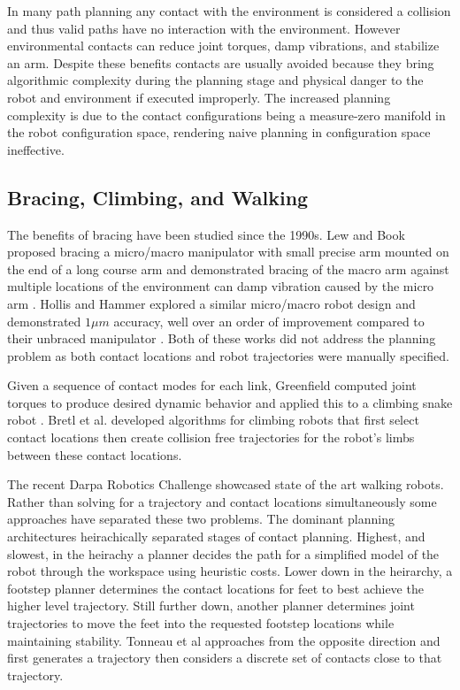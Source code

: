\documentclass[../thesis.tex]{subfiles}
\begin{document}
In many path planning any contact with the environment is considered a collision and thus valid paths have no interaction with the environment.
However environmental contacts can reduce joint torques, damp vibrations, and stabilize an arm.
Despite these benefits contacts are usually avoided because they bring algorithmic complexity during the planning stage and physical danger to the robot and environment if executed improperly.
The increased planning complexity is due to the contact configurations being a measure-zero manifold in the robot configuration space, rendering naive planning in configuration space ineffective. 


\subsection{Bracing, Climbing, and Walking}
The benefits of bracing have been studied since the 1990s.
Lew and Book proposed bracing a micro/macro manipulator with small precise arm mounted on the end of a long course arm and demonstrated bracing of the macro arm against multiple locations of the environment can damp vibration caused by the micro arm \cite{Book1994} \cite{Lew1993}.
Hollis and Hammer explored a similar micro/macro robot design and demonstrated $1 \mu m$ accuracy, well over an order of improvement compared to their unbraced manipulator \cite{Hollis1992}.
Both of these works did not address the planning problem as both contact locations and robot trajectories were manually specified.


Given a sequence of contact modes for each link, Greenfield computed joint torques to produce desired dynamic behavior and applied this to a climbing snake robot \cite{Greenfield2005}.
Bretl et al. \cite{Bretl2006} developed algorithms for climbing robots that first select contact locations then create collision free trajectories for the robot's limbs between these contact locations.

The recent Darpa Robotics Challenge showcased state of the art walking robots.
Rather than solving for a trajectory and contact locations simultaneously some approaches have separated these two problems.
The dominant planning architectures heirachically separated stages of contact planning.
Highest, and slowest, in the heirachy a planner decides the path for a simplified model of the robot through the workspace using heuristic costs.
Lower down in the heirarchy, a footstep planner determines the contact locations for feet to best achieve the higher level trajectory.
Still further down, another planner determines joint trajectories to move the feet into the requested footstep locations while maintaining stability.  \cite{Deits2015} \cite{Atkeson2015}
Tonneau et al \cite{Tonneau} approaches from the opposite direction and first generates a trajectory then considers a discrete set of contacts close to that trajectory.
\end{document}
